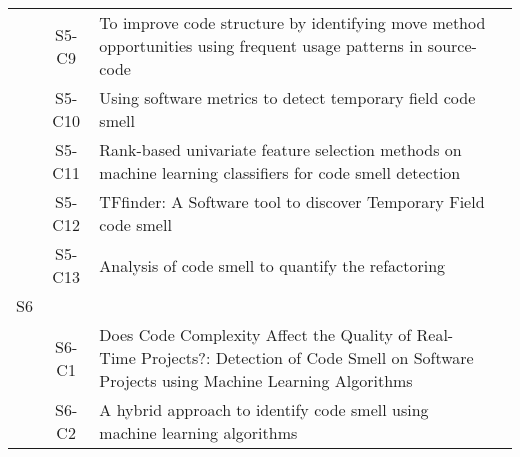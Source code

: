 \begin{longtable}{ccp{9cm}p{3cm}}
    & S5-C9   & To improve code structure by identifying move method opportunities using frequent usage patterns in source-code                                                                                                                                & \citeauthor*{Singh2019}       \\
    & S5-C10  & Using software metrics to detect temporary field code smell                                                                                                                                                                                    & \citeauthor*{Gupta2020a}      \\
    & S5-C11  & Rank-based univariate feature selection methods on machine learning classifiers for code smell detection                                                                                                                                       & \citeauthor*{Jain2022}        \\
    & S5-C12  & TFfinder: A Software tool to discover Temporary Field code smell                                                                                                                                                                               & \citeauthor*{Gupta2020b}      \\
    & S5-C13  & Analysis of code smell to quantify the refactoring                                                                                                                                                                                             & \citeauthor*{Sehgal2017}      \\
S6  &        &                                                                                                                                                                                                                                               &                                 \\
    & S6-C1   & Does Code Complexity Affect the Quality of Real-Time Projects?: Detection of Code Smell on Software Projects using Machine Learning Algorithms                                                                                                 & \citeauthor*{Patnaik2021b}    \\
    & S6-C2   & A hybrid approach to identify code smell using machine learning algorithms                                                                                                                                                                     & \citeauthor*{Patnaik2021a}     \\

\end{longtable}
